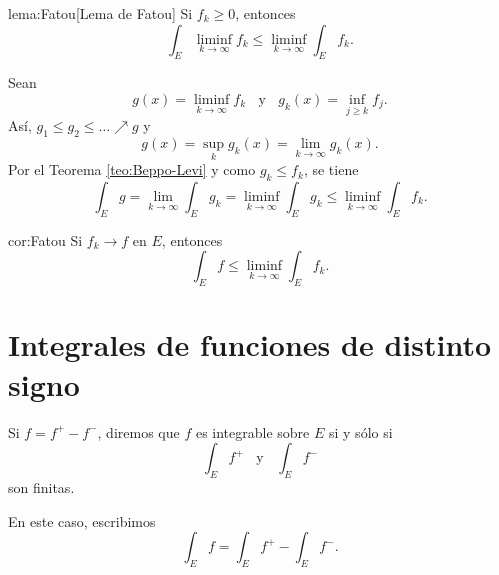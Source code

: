                     
                    \begin{lema}{lema:Fatou}[Lema de Fatou]
                    Si $f_k\geq 0$, entonces
                    \[
                    \int_E \liminf\limits_{k \to \infty} f_k
                    \leq 
                    \liminf\limits_{k\to \infty} \int_E f_k.
                    \]
                    \end{lema}
                    
                    \begin{demo}
                    Sean 
                    \[
                    g(x)=\liminf\limits_{k \to \infty} f_k\;\;
                    \mbox{  y }\;\;
                      g_k(x)=\inf\limits_{j\geq k} f_j.
                    \]
                    As\'i, 
                    $g_1\leq g_2\leq \ldots \nearrow g $ y 
                    \[ g(x)=\sup\limits_{k} g_k(x)=\lim\limits_{k \to \infty} g_k(x).  
                    \]
                    Por el Teorema \ref{teo:Beppo-Levi} y como $g_k \leq f_k$, se tiene 
                    \[
                    \int_E g=\lim\limits_{k \to \infty} \int_E g_k
                    =\liminf\limits_{k \to \infty} \int_E g_k
                    \leq \liminf\limits_{k \to \infty} \int_E f_k.
                    \]
                    \end{demo}
                    
                    
                    \begin{corolario}{cor:Fatou}
                    Si $f_k \to f$ en $E$, entonces
                    \[
                    \int_E f \leq \liminf\limits_{k \to \infty}\int_E f_k.
                    \]
                    \end{corolario}
                    
                    \section{Integrales de funciones de distinto signo}
                    
                    \begin{definicion}{}
                    Si $f=f^+-f^-$, diremos que $f$ es integrable sobre $E$ si y s\'olo si
                    \[
                    \int_E f^+ \;\;\mbox{ y }\;\;
                    \int_E f^-
                    \]
                    son finitas. 
                    
                    En este caso, escribimos
                    \[
                    \int_E f =\int_E f^+ - \int_E f^-.
                    \]
                    \end{definicion}
                    
